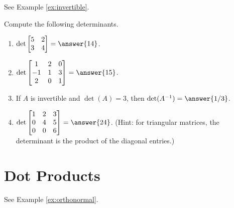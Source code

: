 \documentclass{ximera}
\begin{document}
See Example \ref{ex:invertible}.

\begin{example}
    Compute the following determinants.
    \begin{enumerate}
        \item $\det\begin{bmatrix} 5 & 2 \\ 3 & 4 \end{bmatrix} = \answer{14}$.

        \item $\det\begin{bmatrix} 1 & 2 & 0 \\ -1 & 1 & 3 \\ 2 & 0 & 1 \end{bmatrix} = \answer{15}$.

        \item If $A$ is invertible and $\det(A) = 3$, then $\det(A^{-1}) = \answer{1/3}$.

        \item $\det\begin{bmatrix} 1 & 2 & 3 \\ 0 & 4 & 5 \\ 0 & 0 & 6 \end{bmatrix} = \answer{24}$. (Hint: for triangular matrices, the determinant is the product of the diagonal entries.)
    \end{enumerate}
\end{example}

\section*{Dot Products}

See Example \ref{ex:orthonormal}.
\end{document}
